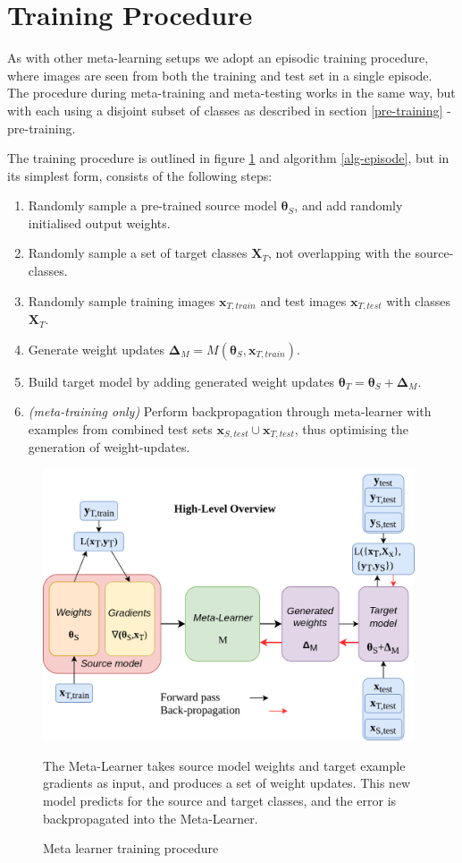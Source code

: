 \documentclass{report}
\begin{document}
\section{Training Procedure}
As with other meta-learning setups we adopt an episodic training procedure, where images are seen from both the training and test set in a single episode. The procedure during meta-training and meta-testing works in the same way, but with each using a disjoint subset of classes as described in section \ref{pre-training} - pre-training. \par
The training procedure is outlined in figure \ref{fig:ml:2} and algorithm \ref{alg-episode}, but in its simplest form, consists of the following steps:
\begin{enumerate}
	\item Randomly sample a pre-trained source model $\bm{\theta}_S$, and add randomly initialised output weights.
	\item Randomly sample a set of target classes $\bm{X}_T$, not overlapping with the source-classes.
	\item Randomly sample training images $\bm{x}_{T,train}$ and test images $\bm{x}_{T,test}$ with classes $\bm{X}_T$.
	\item Generate weight updates $\bm{\Delta}_M = M(\bm{\theta}_S, \bm{x}_{T,train})$.
	\item Build target model by adding generated weight updates $\bm{\theta}_T = \bm{\theta}_S + \bm{\Delta}_M$.
	\item \textit{(meta-training only)} Perform backpropagation through meta-learner with examples from combined test sets $\bm{x}_{S,test} \cup \bm{x}_{T,test}$, thus optimising the generation of weight-updates.
\end{enumerate}
\begin{figure}[h!]
	\centering
	\includegraphics[width=11cm]{metalearneroverview}
	\caption{Meta learner training procedure}
	\label{fig:ml:2}
	The Meta-Learner takes source model weights and target example gradients as input, and produces a set of weight updates. This new model predicts for the source and target classes, and the error is backpropagated into the Meta-Learner. 
\end{figure}
\end{document}
